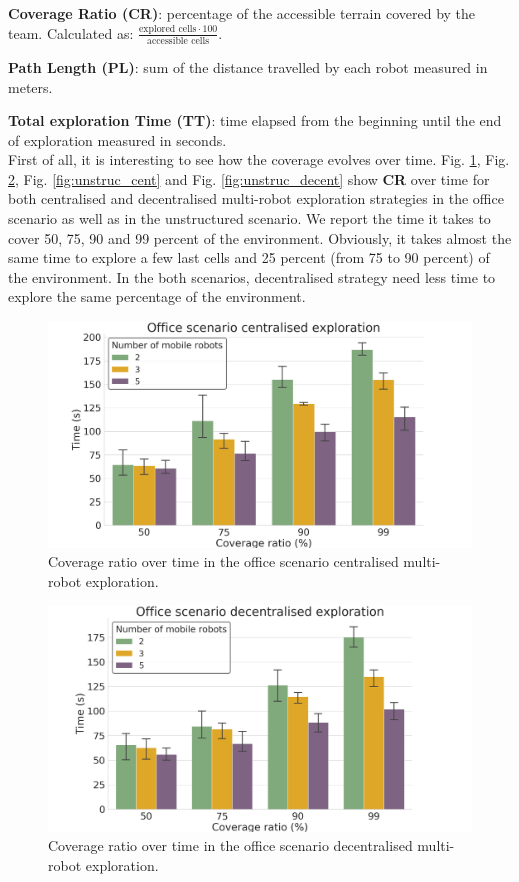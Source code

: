 \documentclass[letterpaper, 10 pt, conference]{ieeeconf}  %
\begin{document}
\textbf{Coverage Ratio (CR)}: percentage of the accessible terrain covered by the team. Calculated as:  \( \frac{\text{explored cells} \cdot 100}{\text{accessible cells}} \).

\textbf{Path Length (PL)}: sum of the distance travelled by each robot measured in meters.

\textbf{Total exploration Time (TT)}: time elapsed from the beginning until the end of exploration measured in seconds.\\

First of all, it is interesting to see how the coverage evolves over time. Fig. \ref{fig:office_cent}, Fig. \ref{fig:office_decent}, Fig. \ref{fig:unstruc_cent} and Fig. \ref{fig:unstruc_decent} show \textbf{CR} over time for both centralised and decentralised multi-robot exploration strategies in the office scenario as well as in the unstructured scenario. We report the time it takes to cover 50, 75, 90 and 99 percent of the environment. Obviously, it takes almost the same time to explore a few last cells and 25 percent (from 75 to 90 percent) of the environment. In the both scenarios, decentralised strategy need less time to explore the same percentage of the environment.  

\begin{figure}[b!]
	\centering\includegraphics[width=0.9\columnwidth]{office_coverage_cent.png}
	\caption{Coverage ratio over time in the office scenario centralised multi-robot exploration.}
	\label{fig:office_cent}
\end{figure}

\begin{figure}[h!]
	\centering\includegraphics[width=0.9\columnwidth]{office_coverage_decent.png}
	\caption{Coverage ratio over time in the office scenario decentralised multi-robot exploration.}
	\label{fig:office_decent}
\end{figure}
\end{document}
